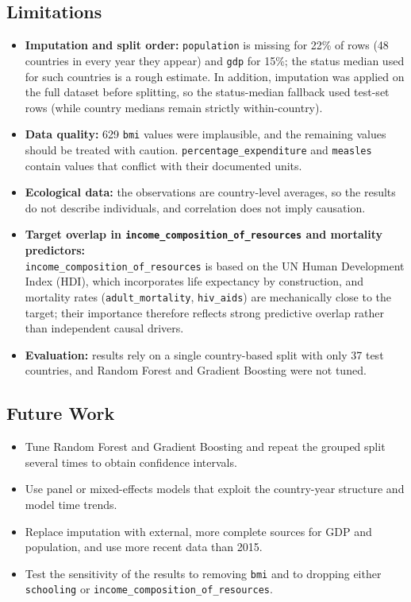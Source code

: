 \documentclass[12pt,a4paper]{article}
\begin{document}
\subsection{Limitations}
\begin{itemize}
  \item \textbf{Imputation and split order:} \texttt{population} is missing for 22\% of rows
        (48 countries in every year they appear) and \texttt{gdp} for 15\%; the status median used
        for such countries is a rough estimate. In addition, imputation was applied on the full
        dataset before splitting, so the status-median fallback used test-set rows (while country
        medians remain strictly within-country).
  \item \textbf{Data quality:} 629 \texttt{bmi} values were implausible, and the remaining
        values should be treated with caution. \texttt{percentage\_expenditure} and
        \texttt{measles} contain values that conflict with their documented units.
  \item \textbf{Ecological data:} the observations are country-level averages, so the results do
        not describe individuals, and correlation does not imply causation.
  \item \textbf{Target overlap in \texttt{income\_composition\_of\_resources} and mortality predictors:} \\ 
        \texttt{income\_composition\_of\_resources} is based on the UN Human Development Index (HDI),
        which incorporates life expectancy by construction, and mortality rates
        (\texttt{adult\_mortality}, \texttt{hiv\_aids}) are mechanically close to the target;
        their importance therefore reflects strong predictive overlap rather than independent
        causal drivers.
  \item \textbf{Evaluation:} results rely on a single country-based split with only 37 test countries,
        and Random Forest and Gradient Boosting were not tuned.
\end{itemize}

\subsection{Future Work}
\begin{itemize}
  \item Tune Random Forest and Gradient Boosting and repeat the grouped split several times to
        obtain confidence intervals.
  \item Use panel or mixed-effects models that exploit the country-year structure and model time trends.
  \item Replace imputation with external, more complete sources for GDP and population, and use
        more recent data than 2015.
  \item Test the sensitivity of the results to removing \texttt{bmi} and to dropping either
        \texttt{schooling} or \texttt{income\_composition\_of\_resources}.
\end{itemize}
\end{document}
